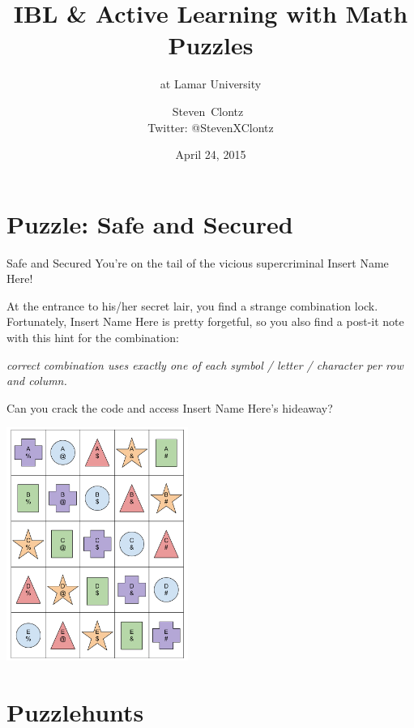 \documentclass{beamer}
\title
{IBL \& Active Learning with Math Puzzles}
\subtitle
{at Lamar University} %
\author%
{Steven~Clontz~\\Twitter: @StevenXClontz}%
\institute[Auburn University] %
{
  Department of Mathematics and Statistics\\
  Auburn University}
\date[15-04-24] %
{April 24, 2015}
\theoremstyle{theorem}
\theoremstyle{definition}
\newcommand{\<}{\langle}
\renewcommand{\>}{\rangle}
\newcommand{\vpause}{\pause\vspace{1em}}
\begin{document}

\begin{frame}
  \titlepage
\end{frame}


\section{Puzzle: Safe and Secured}

\begin{frame}{Safe and Secured}
  You're on the tail of the vicious supercriminal Insert Name Here!

  \vpause

  At the entrance to his/her secret lair, you find a strange combination
  lock. Fortunately, Insert Name Here is pretty forgetful, so you also find
  a post-it note with this hint for the combination:

  \vpause

  \textit{%
    correct combination uses exactly one of each symbol / letter /
    character per row and column.
  }

  \vpause

  Can you crack the code and access Insert Name Here's hideaway?
\end{frame}

\begin{frame}
  \centerline{\includegraphics[height=3in]{safeAndSecured.pdf}}
\end{frame}

\section{Puzzlehunts}
\end{document}
